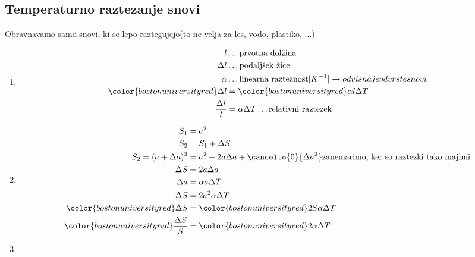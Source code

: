 {\color{indiagreen}\subsection{Temperaturno raztezanje snovi}}
Obravnavamo samo snovi, ki se lepo raztegujejo(to ne velja za les, vodo, plastiko, $\dots$)\\
\begin{enumerate}
	\item 
		\begin{align*}
			l & \dots \text{prvotna dolžina}\\
			\Delta l & \dots \text{podaljšek žice}\\
			\alpha & \dots \text{linearna razteznost} [K^{-1}] \rightarrow odvisna je od vrste snovi\\
			{\color{bostonuniversityred}\Delta l} &= {\color{bostonuniversityred}\alpha l \Delta T}\\
			\frac{\Delta l}{l} &= \alpha \Delta T \dots \text{relativni raztezek}\\
		\end{align*}
	\item
		\begin{align*}
			S_1 &= a^2\\
			S_2 &= S_1 + \Delta S\\
			S_2 = (a+\Delta a)^2 &= a^2 + 2a\Delta a + \cancelto{0}{\Delta a^2} \text{zanemarimo, ker so raztezki tako majhni}\\
			\Delta S &= 2a\Delta a\\
			\Delta a &= \alpha a \Delta T\\
			\Delta S &= 2a^2\alpha \Delta T\\
			{\color{bostonuniversityred}\Delta S} &= {\color{bostonuniversityred}2S\alpha \Delta T}\\
			{\color{bostonuniversityred}\frac{\Delta S}{S}} &= {\color{bostonuniversityred}2\alpha \Delta T}\\
		\end{align*}
	\item

\end{enumerate}
